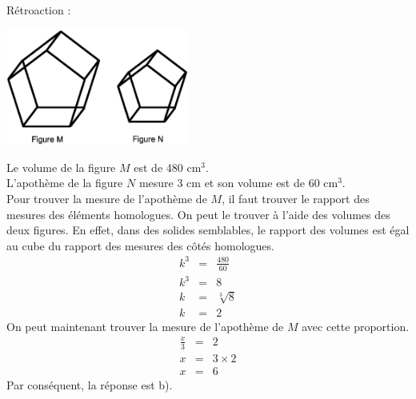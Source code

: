 \documentclass[letterpaper, 12pt]{article}
\begin{document}
R\'etroaction :\\
\begin{center}
 \includegraphics[width=6cm,bb=14 14 588 376]{Q2550.eps}
\end{center}
Le volume de la figure $M$ est de 480 cm$^{3}$.\\
L'apoth\`eme de la figure $N$ mesure 3 cm et son volume est de 60 cm$^{3}$.\\
Pour trouver la mesure de l'apoth\`eme de $M$, il faut trouver le rapport des mesures des \'el\'ements homologues. On peut le trouver \`a l'aide des volumes des deux figures. En effet, dans des solides semblables, le rapport des volumes est \'egal au cube du rapport des mesures des c\^ot\'es homologues.
\begin{eqnarray*}
k^{3}&=&\frac{480}{60}\\[2mm]
k^{3}&=&8\\
k&=&\sqrt[3]{8}\\
k&=&2
\end{eqnarray*}
On peut maintenant trouver la mesure de l'apoth\`eme de $M$ avec cette proportion.
\begin{eqnarray*}
 \frac{x}{3}&=&2\\[2mm]
x&=&3 \times 2\\[2mm]
x&=&6
\end{eqnarray*}
Par cons\'equent, la r\'eponse est b).\\
\end{document}
